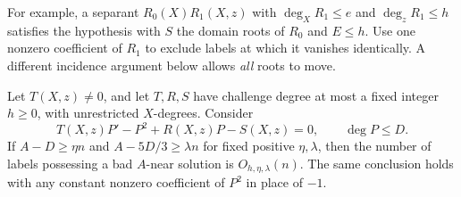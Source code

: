 For example, a separant $R_0(X)R_1(X,z)$ with
$\deg_XR_1\le e$ and $\deg_zR_1\le h$ satisfies the hypothesis with
$S$ the domain roots of $R_0$ and $E\le h$. Use one nonzero coefficient
of $R_1$ to exclude labels at which it vanishes identically. A different
incidence argument below allows \emph{all} roots to move.

\begin{theorem}
\label{thm:monic-riccati-linear}
Let $T(X,z)\ne0$, and let $T,R,S$ have challenge degree at most a fixed
integer $h\ge0$, with unrestricted $X$-degrees. Consider
\begin{equation}\label{eq:monic-riccati-family}
 T(X,z)P'-P^2+R(X,z)P-S(X,z)=0,\qquad \deg P\le D.
\end{equation}
If $A-D\ge\eta n$ and $A-5D/3\ge\lambda n$ for fixed positive
$\eta,\lambda$, then the number of labels possessing a bad $A$-near
solution is $O_{h,\eta,\lambda}(n)$. The same conclusion holds with
any constant nonzero coefficient of $P^2$ in place of $-1$.
\end{theorem}
